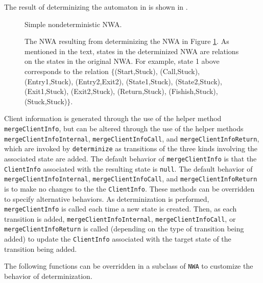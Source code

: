 

The result of determinizing the automaton in  is shown in
.

\begin{figure}[p]
  \centering
  \caption{Simple nondeterministic NWA.}
  \label{Fi:Det1}
\end{figure}


\begin{figure}[p]
  \centering
    \caption{The NWA resulting from determinizing the NWA in Figure
      \ref{Fi:Det1}. As mentioned in the text, states in the determinized
      NWA are relations on the states in the original NWA. For example, state
      1 above corresponds to the relation $\{$(Start,Stuck), (Call,Stuck),
      (Entry1,Stuck), (Entry2,Exit2), (State1,Stuck), (State2,Stuck),
      (Exit1,Stuck), (Exit2,Stuck), (Return,Stuck), (Fishish,Stuck),
      (Stuck,Stuck)$\}$.}
 
  \label{Fi:Det2}
\end{figure}


Client information is generated through the use of the helper method
\texttt{mergeClientInfo}, but can be altered through the use of the helper
methods \texttt{mergeClientInfoInternal}, \texttt{mergeClientInfoCall}, and
\texttt{mergeClientInfoReturn}, which are invoked by \texttt{determinize} as
transitions of the three kinds involving the associated state are added.  The
default behavior of \texttt{mergeClientInfo} is that the \texttt{ClientInfo}
associated with the resulting state is \texttt{null}.  The default behavior
of \texttt{mergeClientInfoInternal}, \texttt{mergeClientInfoCall}, and
\texttt{mergeClientInfoReturn} is to make no changes to the the
\texttt{ClientInfo}.  These methods can be overridden to specify alternative
behaviors.  As determinization is performed, \texttt{mergeClientInfo} is
called each time a new state is created.  Then, as each transition is added,
\texttt{mergeClientInfoInternal}, \texttt{mergeClientInfoCall}, or
\texttt{mergeClientInfoReturn} is called (depending on the type of transition
being added) to update the \texttt{ClientInfo} associated with the target
state of the transition being added.

The following functions can be overridden in a subclass of \texttt{NWA} to
customize the behavior of determinization.

